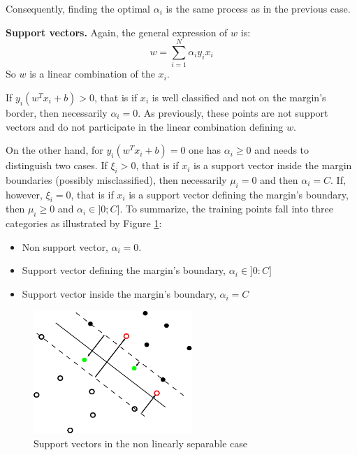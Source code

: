 \documentclass{article}
\begin{document}
Consequently, finding the optimal $\alpha_i$ is the same process as in the previous case.

\textbf{Support vectors.} Again, the general expression of $w$ is:
\begin{equation*}
w = \sum_{i=1}^N \alpha_i y_i x_i
\end{equation*}
So $w$ is a linear combination of the $x_i$.

If $y_i\left( w^Tx_i + b \right) > 0$, that is if $x_i$ is well classified and not on the margin's border, then necessarily $\alpha_i = 0$. As previously, these points are not support vectors and do not participate in the linear combination defining $w$.

On the other hand, for $y_i\left( w^Tx_i + b \right) = 0$ one has $\alpha_i \geq 0$ and needs to distinguish two cases. If $\xi_i>0$, that is if $x_i$ is a support vector inside the margin boundaries (possibly misclassified), then necessarily $\mu_i=0$ and then $\alpha_i = C$. If, however, $\xi_i=0$, that is if $x_i$ is a support vector defining the margin's boundary, then $\mu_i \geq 0$ and $\alpha_i \in ]0;C]$. To summarize, the training points fall into three categories as illustrated by Figure \ref{fig:nlin-lin2}:
\begin{itemize}
\item Non support vector, $\alpha_i = 0$.
\item Support vector defining the margin's boundary, $\alpha_i \in ]0:C]$
\item Support vector inside the margin's boundary, $\alpha_i=C$
\end{itemize}
\begin{figure}
\begin{center}
\includegraphics[width=6cm]{../img/non_lin_sep3.pdf}
\end{center}
\caption{Support vectors in the non linearly separable case}
\label{fig:nlin-lin2}
\end{figure}
\end{document}
